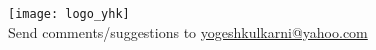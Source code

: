 \newpage
\thispagestyle{empty}
\begin{titlepage}
    \begin{center}
        \begin{tcolorbox}[coverstyle, title=Thank You!]
            \vspace*{7cm}
            \texttt{[image: logo\_yhk]}\\[3cm]
            Send comments/suggestions to {\Large \href{mailto:yogeshkulkarni@yahoo.com}{yogeshkulkarni@yahoo.com}}\\
            \vspace*{7cm}
        \end{tcolorbox}
    \end{center}
\end{titlepage}